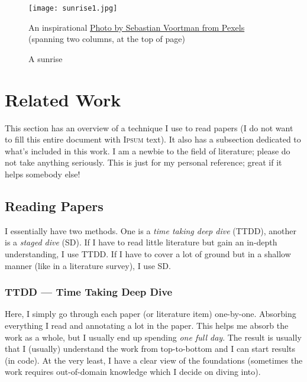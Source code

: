 
\begin{figure*}[ht]
    \centering
    \texttt{[image: sunrise1.jpg]}
    \caption{A sunrise}
    \label{fig:sunrise}
    \small
        An inspirational \href{https://www.pexels.com/photo/body-of-water-during-golden-hour-189349/}{Photo by Sebastian Voortman from Pexels} (spanning two columns, at the top of page)
\end{figure*}


\section{Related Work}

This section has an overview of a technique I use to read papers (I do not want to fill this entire document with \textsc{Ipsum} text). It also has a subsection dedicated to what's included in this work. I am a newbie to the field of literature; please do not take anything seriously. This is just for my personal reference; great if it helps somebody else!


\subsection{Reading Papers}
\label{sub:read-papers}

I essentially have two methods. One is a \emph{time taking deep dive} (TTDD), another is a \emph{staged dive} (SD). If I have to read little literature but gain an in-depth understanding, I use TTDD. If I have to cover a lot of ground but in a shallow manner (like in a literature survey), I use SD.

\subsubsection{TTDD --- Time Taking Deep Dive}

Here, I simply go through each paper (or literature item) one-by-one. Absorbing everything I read and annotating a lot in the paper. This helps me absorb the work as a whole, but I usually end up spending \emph{one full day}. The result is usually that I (usually) understand the work from top-to-bottom and I can start results (in code). At the very least, I have a clear view of the foundations (sometimes the work requires out-of-domain knowledge which I decide on diving into).

